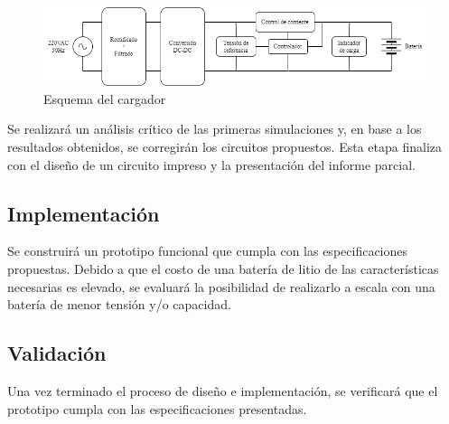 \begin{figure}
    \centering
    \includegraphics[width=\textwidth]{images/esquema_cargador.png}
    \caption{Esquema del cargador}
    \label{fig:esquema_cargador}
\end{figure}

Se realizará un análisis crítico de las primeras simulaciones y, en base a los resultados obtenidos, 
se corregirán los circuitos propuestos. 
Esta etapa finaliza con el diseño de un circuito impreso y la presentación del informe parcial. 

\subsection{Implementación}
Se construirá un prototipo funcional que cumpla con las especificaciones propuestas. 
Debido a que el costo de una batería de litio de las características necesarias es elevado,
se evaluará la posibilidad de realizarlo a escala con una batería de menor tensión y/o capacidad.

\subsection{Validación}
Una vez terminado el proceso de diseño e implementación,
se verificará que el prototipo cumpla con las especificaciones presentadas. 







